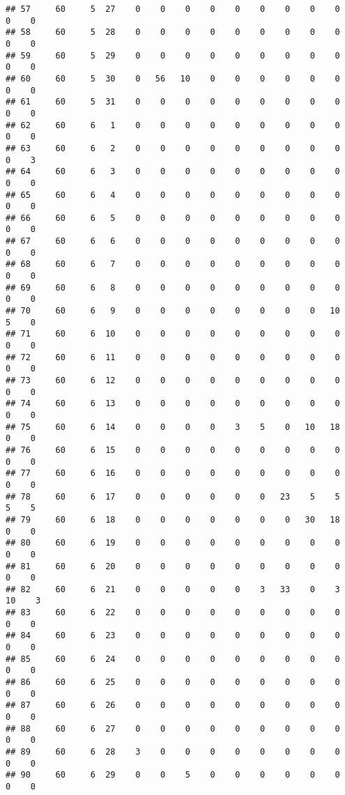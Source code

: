 \documentclass[]{article}
\begin{document}
\begin{verbatim}
## 57     60     5  27    0    0    0    0    0    0    0    0    0    0    0
## 58     60     5  28    0    0    0    0    0    0    0    0    0    0    0
## 59     60     5  29    0    0    0    0    0    0    0    0    0    0    0
## 60     60     5  30    0   56   10    0    0    0    0    0    0    0    0
## 61     60     5  31    0    0    0    0    0    0    0    0    0    0    0
## 62     60     6   1    0    0    0    0    0    0    0    0    0    0    0
## 63     60     6   2    0    0    0    0    0    0    0    0    0    0    3
## 64     60     6   3    0    0    0    0    0    0    0    0    0    0    0
## 65     60     6   4    0    0    0    0    0    0    0    0    0    0    0
## 66     60     6   5    0    0    0    0    0    0    0    0    0    0    0
## 67     60     6   6    0    0    0    0    0    0    0    0    0    0    0
## 68     60     6   7    0    0    0    0    0    0    0    0    0    0    0
## 69     60     6   8    0    0    0    0    0    0    0    0    0    0    0
## 70     60     6   9    0    0    0    0    0    0    0    0   10    5    0
## 71     60     6  10    0    0    0    0    0    0    0    0    0    0    0
## 72     60     6  11    0    0    0    0    0    0    0    0    0    0    0
## 73     60     6  12    0    0    0    0    0    0    0    0    0    0    0
## 74     60     6  13    0    0    0    0    0    0    0    0    0    0    0
## 75     60     6  14    0    0    0    0    3    5    0   10   18    0    0
## 76     60     6  15    0    0    0    0    0    0    0    0    0    0    0
## 77     60     6  16    0    0    0    0    0    0    0    0    0    0    0
## 78     60     6  17    0    0    0    0    0    0   23    5    5    5    5
## 79     60     6  18    0    0    0    0    0    0    0   30   18    0    0
## 80     60     6  19    0    0    0    0    0    0    0    0    0    0    0
## 81     60     6  20    0    0    0    0    0    0    0    0    0    0    0
## 82     60     6  21    0    0    0    0    0    3   33    0    3   10    3
## 83     60     6  22    0    0    0    0    0    0    0    0    0    0    0
## 84     60     6  23    0    0    0    0    0    0    0    0    0    0    0
## 85     60     6  24    0    0    0    0    0    0    0    0    0    0    0
## 86     60     6  25    0    0    0    0    0    0    0    0    0    0    0
## 87     60     6  26    0    0    0    0    0    0    0    0    0    0    0
## 88     60     6  27    0    0    0    0    0    0    0    0    0    0    0
## 89     60     6  28    3    0    0    0    0    0    0    0    0    0    0
## 90     60     6  29    0    0    5    0    0    0    0    0    0    0    0

\end{verbatim}
\end{document}
